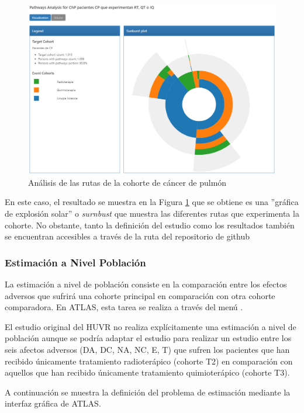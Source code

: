 \begin{figure}[H]
    \centering
    \includegraphics[width=1\textwidth]{figures/pathway.png}
    \caption{Análisis de las rutas de la cohorte de cáncer de pulmón}
    \label{table:pathway}
\end{figure}

En este caso, el resultado se muestra en la Figura \ref{table:pathway} que se obtiene es una ''gráfica de explosión solar'' o \textit{surnbust} que muestra las diferentes rutas que experimenta la cohorte. No obstante, tanto la definición del estudio como los resultados también se encuentran accesibles a través de la ruta del repositorio de github  


\subsubsection{Estimación a Nivel Población}

La estimación a nivel de población consiste en la comparación entre los efectos adversos que sufrirá una cohorte principal en comparación con otra cohorte comparadora. En ATLAS, esta tarea se realiza a través del menú .

El estudio original del HUVR no realiza explícitamente una estimación a nivel de población aunque se podría adaptar el estudio para realizar un estudio entre los seis afectos adversos (DA, DC, NA, NC, E, T) que sufren los pacientes que han recibido únicamente tratamiento radioterápico (cohorte T2) en comparación con aquellos que han recibido únicamente tratamiento quimioterápico (cohorte T3).

A continuación se muestra la definición del problema de estimación mediante la interfaz gráfica de ATLAS.

